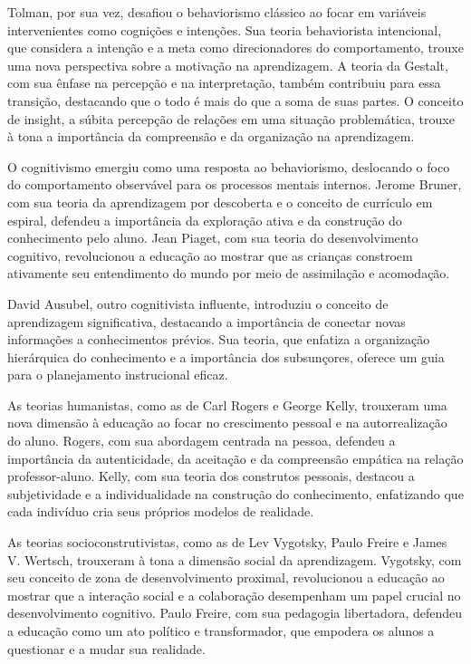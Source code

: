 Tolman, por sua vez, desafiou o behaviorismo clássico ao focar em variáveis intervenientes como cognições e intenções. Sua teoria behaviorista intencional, que considera a intenção e a meta como direcionadores do comportamento, trouxe uma nova perspectiva sobre a motivação na aprendizagem. A teoria da Gestalt, com sua ênfase na percepção e na interpretação, também contribuiu para essa transição, destacando que o todo é mais do que a soma de suas partes. O conceito de insight, a súbita percepção de relações em uma situação problemática, trouxe à tona a importância da compreensão e da organização na aprendizagem.

O cognitivismo emergiu como uma resposta ao behaviorismo, deslocando o foco do comportamento observável para os processos mentais internos. Jerome Bruner, com sua teoria da aprendizagem por descoberta e o conceito de currículo em espiral, defendeu a importância da exploração ativa e da construção do conhecimento pelo aluno. Jean Piaget, com sua teoria do desenvolvimento cognitivo, revolucionou a educação ao mostrar que as crianças constroem ativamente seu entendimento do mundo por meio de assimilação e acomodação.

David Ausubel, outro cognitivista influente, introduziu o conceito de aprendizagem significativa, destacando a importância de conectar novas informações a conhecimentos prévios. Sua teoria, que enfatiza a organização hierárquica do conhecimento e a importância dos subsunçores, oferece um guia para o planejamento instrucional eficaz.

As teorias humanistas, como as de Carl Rogers e George Kelly, trouxeram uma nova dimensão à educação ao focar no crescimento pessoal e na autorrealização do aluno. Rogers, com sua abordagem centrada na pessoa, defendeu a importância da autenticidade, da aceitação e da compreensão empática na relação professor-aluno. Kelly, com sua teoria dos construtos pessoais, destacou a subjetividade e a individualidade na construção do conhecimento, enfatizando que cada indivíduo cria seus próprios modelos de realidade.

As teorias socioconstrutivistas, como as de Lev Vygotsky, Paulo Freire e James V. Wertsch, trouxeram à tona a dimensão social da aprendizagem. Vygotsky, com seu conceito de zona de desenvolvimento proximal, revolucionou a educação ao mostrar que a interação social e a colaboração desempenham um papel crucial no desenvolvimento cognitivo. Paulo Freire, com sua pedagogia libertadora, defendeu a educação como um ato político e transformador, que empodera os alunos a questionar e a mudar sua realidade.


